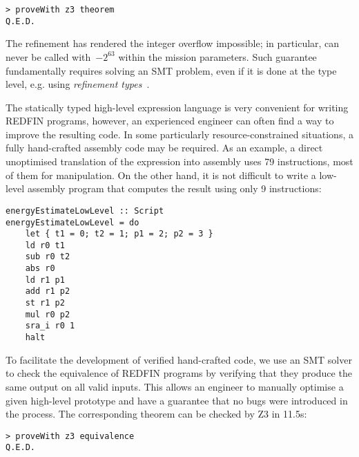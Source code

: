 \begin{verbatim}
> proveWith z3 theorem
Q.E.D.
\end{verbatim}

\noindent
The refinement has rendered the integer overflow impossible;
in particular,  can never be called with~$-2^{63}$
within the mission parameters. Such guarantee fundamentally requires
solving an SMT problem, even if it is done at the type level, e.g. using
\emph{refinement types}~\cite{vazou2014refinement}.

The statically typed high-level expression language is very convenient for
writing REDFIN programs, however, an experienced engineer can often find a way
to improve the resulting code. In some particularly resource-constrained situations,
a fully hand-crafted assembly code may be required. As an example, a direct
unoptimised translation of the  expression into assembly uses
79 instructions, most of them for  manipulation.
On the other hand, it is not difficult to write a low-level assembly program that
computes the result using only 9 instructions:

\begin{verbatim}
energyEstimateLowLevel :: Script
energyEstimateLowLevel = do
    let { t1 = 0; t2 = 1; p1 = 2; p2 = 3 }
    ld r0 t1
    sub r0 t2
    abs r0
    ld r1 p1
    add r1 p2
    st r1 p2
    mul r0 p2
    sra_i r0 1
    halt
\end{verbatim}
\label{energyEstimateLowLevel}

\noindent
To facilitate the development of verified hand-crafted code, we use an SMT
solver to check the equivalence of REDFIN programs by verifying that they produce
the same output on all valid inputs. This allows an engineer to manually
optimise a given high-level prototype and have a guarantee that no bugs were
introduced in the process. The corresponding  theorem can be
checked by Z3 in 11.5s:

\begin{verbatim}
> proveWith z3 equivalence
Q.E.D.
\end{verbatim}


